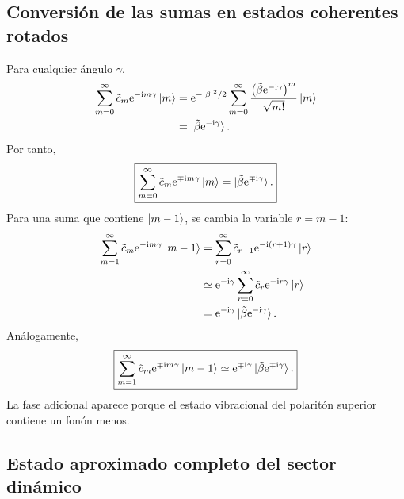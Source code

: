 \documentclass[11pt]{article}
\newcommand{\ii}{\mathrm{i}}
\newcommand{\ee}{\mathrm{e}}
\begin{document}
\subsection{Conversi\'on de las sumas en estados coherentes rotados}

Para cualquier \'angulo $\gamma$,
\begin{align}
  \sum_{m=0}^{\infty}
  \tilde c_m\ee^{-\ii m\gamma}\ket m
  &=
  \ee^{-|\tilde\beta|^2/2}
  \sum_{m=0}^{\infty}
  \frac{
  \left(\tilde\beta\ee^{-\ii\gamma}\right)^m
  }{\sqrt{m!}}
  \ket m
  \notag\\
  &=
  \ket{\tilde\beta\ee^{-\ii\gamma}}.
\end{align}
Por tanto,
\begin{equation}
  \boxed{
  \sum_{m=0}^{\infty}
  \tilde c_m\ee^{\mp\ii m\gamma}\ket m
  =
  \ket{\tilde\beta\ee^{\mp\ii\gamma}}.
  }
\end{equation}
Para una suma que contiene $\ket{m-1}$, se cambia la variable
$r=m-1$:
\begin{align}
  \sum_{m=1}^{\infty}
  \tilde c_m\ee^{-\ii m\gamma}\ket{m-1}
  &=
  \sum_{r=0}^{\infty}
  \tilde c_{r+1}\ee^{-\ii(r+1)\gamma}\ket r
  \notag\\
  &\simeq
  \ee^{-\ii\gamma}
  \sum_{r=0}^{\infty}
  \tilde c_r\ee^{-\ii r\gamma}\ket r
  \notag\\
  &=
  \ee^{-\ii\gamma}
  \ket{\tilde\beta\ee^{-\ii\gamma}}.
\end{align}
An\'alogamente,
\begin{equation}
  \boxed{
  \sum_{m=1}^{\infty}
  \tilde c_m\ee^{\mp\ii m\gamma}\ket{m-1}
  \simeq
  \ee^{\mp\ii\gamma}
  \ket{\tilde\beta\ee^{\mp\ii\gamma}}.
  }
\end{equation}
La fase adicional aparece porque el estado vibracional del polarit\'on
superior contiene un fon\'on menos.

\subsection{Estado aproximado completo del sector din\'amico}
\end{document}
